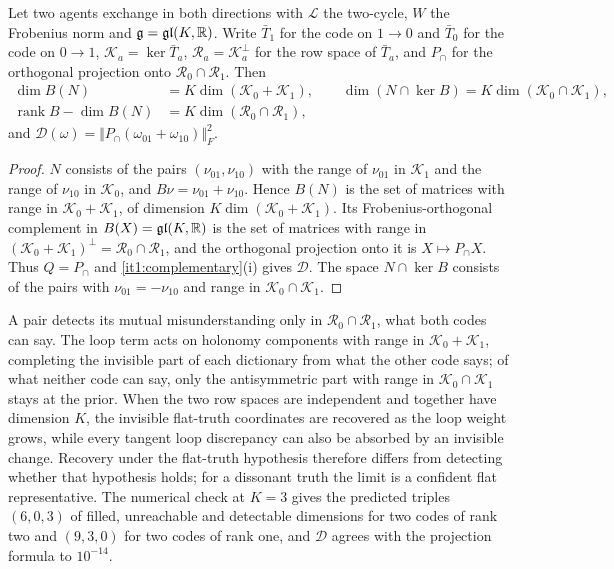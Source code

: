 \documentclass[11pt,letterpaper]{report}
\begin{document}
Let two agents exchange in both directions with $\mathcal L$ the two-cycle, $W$ the Frobenius norm and $\mathfrak g=\mathfrak{gl}(K,\mathbb R)$. Write $\bar T_1$ for the code on $1\to0$ and $\bar T_0$ for the code on $0\to1$, $\mathcal K_a=\ker\bar T_a$, $\mathcal R_a=\mathcal K_a^\perp$ for the row space of $\bar T_a$, and $P_\cap$ for the orthogonal projection onto $\mathcal R_0\cap\mathcal R_1$. Then
\begin{equation}
\begin{aligned}
\dim B(N)&=K\dim(\mathcal K_0+\mathcal K_1),\qquad
\dim(N\cap\ker B)=K\dim(\mathcal K_0\cap\mathcal K_1),\\
\operatorname{rank}B-\dim B(N)&=K\dim(\mathcal R_0\cap\mathcal R_1),
\end{aligned}
\label{it1:pair-split}
\end{equation}
and $\mathcal D(\omega)=\Vert P_\cap(\omega_{01}+\omega_{10})\Vert_F^2$.
\begin{proof}
$N$ consists of the pairs $(\nu_{01},\nu_{10})$ with the range of $\nu_{01}$ in $\mathcal K_1$ and the range of $\nu_{10}$ in $\mathcal K_0$, and $B\nu=\nu_{01}+\nu_{10}$. Hence $B(N)$ is the set of matrices with range in $\mathcal K_0+\mathcal K_1$, of dimension $K\dim(\mathcal K_0+\mathcal K_1)$. Its Frobenius-orthogonal complement in $B(X)=\mathfrak{gl}(K,\mathbb R)$ is the set of matrices with range in $(\mathcal K_0+\mathcal K_1)^\perp=\mathcal R_0\cap\mathcal R_1$, and the orthogonal projection onto it is $X\mapsto P_\cap X$. Thus $Q=P_\cap$ and \cref{it1:complementary}(i) gives $\mathcal D$. The space $N\cap\ker B$ consists of the pairs with $\nu_{01}=-\nu_{10}$ and range in $\mathcal K_0\cap\mathcal K_1$.
\end{proof}

A pair detects its mutual misunderstanding only in $\mathcal R_0\cap\mathcal R_1$, what both codes can say. The loop term acts on holonomy components with range in $\mathcal K_0+\mathcal K_1$, completing the invisible part of each dictionary from what the other code says; of what neither code can say, only the antisymmetric part with range in $\mathcal K_0\cap\mathcal K_1$ stays at the prior. When the two row spaces are independent and together have dimension $K$, the invisible flat-truth coordinates are recovered as the loop weight grows, while every tangent loop discrepancy can also be absorbed by an invisible change. Recovery under the flat-truth hypothesis therefore differs from detecting whether that hypothesis holds; for a dissonant truth the limit is a confident flat representative. The numerical check at $K=3$ gives the predicted triples $(6,0,3)$ of filled, unreachable and detectable dimensions for two codes of rank two and $(9,3,0)$ for two codes of rank one, and $\mathcal D$ agrees with the projection formula to $10^{-14}$.
\end{document}
